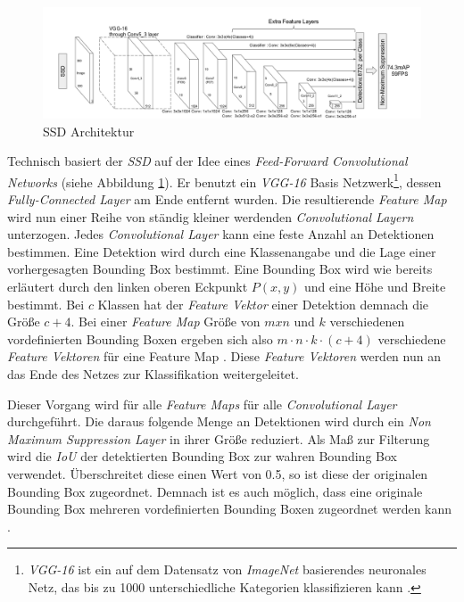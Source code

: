 \begin{figure}[ht]
	\begin{center}
		\includegraphics[width=15cm]{Bilder/ssd_architecture.png} 
		\caption[SSD Architektur]{SSD Architektur \cite{ssd.20161229}}
		\label{architecture}
	\end{center}
\end{figure}

Technisch basiert der \textit{SSD} auf der Idee eines \textit{Feed-Forward Convolutional Networks} (siehe Abbildung \ref{architecture}). Er benutzt ein \textit{VGG-16} Basis Netzwerk\footnote{\textit{VGG-16} ist ein auf dem Datensatz von \textit{ImageNet} basierendes neuronales Netz, das bis zu 1000 unterschiedliche Kategorien klassifizieren kann \cite{KarenSimonyan.2015}.}, dessen \textit{Fully-Connected Layer} am Ende entfernt wurden. Die resultierende \textit{Feature Map} wird nun einer Reihe von ständig kleiner werdenden \textit{Convolutional Layern} unterzogen. Jedes \textit{Convolutional Layer} kann eine feste Anzahl an Detektionen bestimmen. Eine Detektion wird durch eine Klassenangabe und die Lage einer vorhergesagten Bounding Box bestimmt. Eine Bounding Box wird wie bereits erläutert durch den linken oberen Eckpunkt $P(x,y)$ und eine Höhe und Breite bestimmt. Bei $c$ Klassen hat der \textit{Feature Vektor} einer Detektion demnach die Größe $c+4$. Bei einer \textit{Feature Map} Größe von $m x n$ und $k$ verschiedenen vordefinierten Bounding Boxen ergeben sich also $m \cdot n \cdot k \cdot (c+4)$ verschiedene \textit{Feature Vektoren} für eine Feature Map \cite{ssd.20161229}. Diese \textit{Feature Vektoren} werden nun an das Ende des Netzes zur Klassifikation weitergeleitet.

Dieser Vorgang wird für alle \textit{Feature Maps} für alle \textit{Convolutional Layer} durchgeführt. Die daraus folgende Menge an Detektionen wird durch ein \textit{Non Maximum Suppression Layer} in ihrer Größe reduziert. Als Maß zur Filterung wird die \textit{IoU} der detektierten Bounding Box zur wahren Bounding Box verwendet. Überschreitet diese einen Wert von 0.5, so ist diese der originalen Bounding Box zugeordnet. Demnach ist es auch möglich, dass eine originale Bounding Box mehreren vordefinierten Bounding Boxen zugeordnet werden kann \cite{ssd.20161229}.

